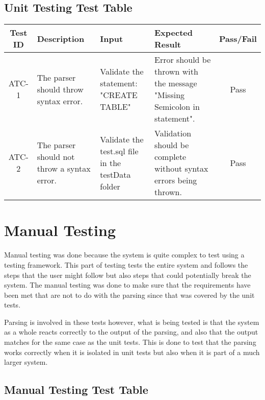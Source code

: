 \subsection{Unit Testing Test Table}

\begin{center}
	\setlength\extrarowheight{2pt}
	\begin{tabularx}{\textwidth}{|c|X|X|X|c|}
		\hline
		\textbf{Test ID} & \textbf{Description} & \textbf{Input} & \textbf{Expected Result} & \textbf{Pass/Fail} \\
		\hline
		ATC-1 & The parser should throw syntax error. & Validate the statement: "CREATE TABLE" & Error should be thrown with the message "Missing Semicolon in statement". & Pass \\
		\hline
		ATC-2 & The parser should not throw a syntax error. & Validate the test.sql file in the testData folder & Validation should be complete without syntax errors being thrown. & Pass \\
		\hline
	\end{tabularx}
\end{center}

\section{Manual Testing}

Manual testing was done because the system is quite complex to test using a testing framework. This part of testing tests the entire system and follows the steps that the user might follow but also steps that could potentially break the system. The manual testing was done to make sure that the requirements have been met that are not to do with the parsing since that was covered by the unit tests. 

Parsing is involved in these tests however, what is being tested is that the system as a whole reacts correctly to the output of the parsing, and also that the output matches for the same case as the unit tests. This is done to test that the parsing works correctly when it is isolated in unit tests but also when it is part of a much larger system.

\subsection{Manual Testing Test Table}

